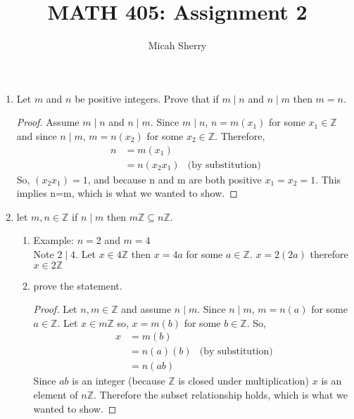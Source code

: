 \documentclass{article}
\title{MATH 405: Assignment 2}
\author{Micah Sherry}
\newcommand{\Z}{\mathbb{Z}}
\newcommand{\divides}{\mid}
\begin{document}
	\maketitle
	\begin{enumerate}
		\item Let $m$ and $n$ be positive integers. Prove that if $m\divides n$ and $n\divides m$ then $m=n$.
		\begin{proof}
			Assume $m\divides n$ and $n\divides m$. 
			Since $m\divides n$, $n = m(x_1)$ for some $x_1 \in \Z$ and since $n\divides m$, $m = n(x_2)$ for some $x_2 \in \Z$. 
			Therefore,
			\begin{align*}
				n &= m(x_1)\\
				  &= n(x_2x_1) & \text{(by substitution)}		  
			\end{align*}
			So, $(x_2x_1) = 1$, and because n and m are both positive $x_1=x_2=1$. This implies n=m, which is what we wanted to show. 
		\end{proof}
			\item let $m, n \in \Z$ if $n\divides m$ then $m\Z \subseteq n\Z$.
		\begin{enumerate}
			\item Example: $n=2$ and $m=4$\\
				Note $2 \divides 4$.
				Let $x \in 4\Z$ then $x = 4a$ for some $a \in \Z$. $x=2(2a)$ therefore $x \in 2\Z$ 
			\item prove the statement. 
			\begin{proof}
				Let $n,m \in \Z$ and assume $n \divides m$. 
				Since $n \divides m$, $m = n(a)$ for some $a \in \Z$. Let $x \in m\Z$ so, $x =m(b)$ for some $b \in \Z$.
				So, 
				\begin{align*}
				 x &= m(b) \\
				   &= n(a)(b) &\text{(by substitution)}\\
				   &= n(ab)
				\end{align*}
				Since $ab$ is an integer (because $\Z$ is closed under multiplication) $x$ is an element of $n\Z$. Therefore the subset relationship holds, which is what we wanted to show.   
			\end{proof}				
		\end{enumerate}
		

\end{enumerate}
\end{document}
